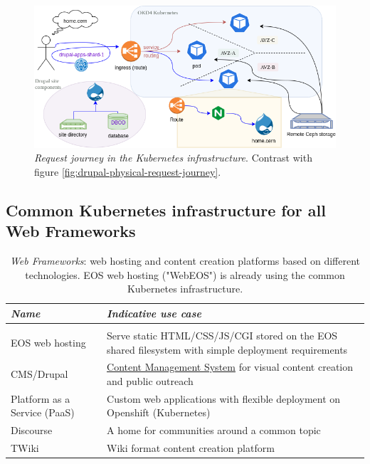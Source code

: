 \begin{figure}[t]
    \centering
    \includegraphics[width=\textwidth]{figures/drupal-k8s-request-journey}
    \caption{\emph{Request journey in the Kubernetes infrastructure}. Contrast with figure \ref{fig:drupal-physical-request-journey}.}
    \label{fig:drupal-k8s-request-journey}
\end{figure}

\subsection{Common Kubernetes infrastructure for all Web Frameworks}
\label{sec-web-frameworks}

\begin{table}[h!]
\begin{tabularx}{\textwidth}{ p{10em}| >{\raggedright\arraybackslash}X}
    \emph{Name} & \emph{Indicative use case} \\
    \hline \\
    EOS web hosting & Serve static HTML/CSS/JS/CGI stored on the EOS shared filesystem with simple deployment requirements \\
    CMS/Drupal & \hyperref[what-is-drupal]{Content Management System} for visual content creation and public outreach \\
    Platform as a Service (PaaS) & Custom web applications with flexible deployment on Openshift (Kubernetes) \\
    Discourse & A home for communities around a common topic \\
    TWiki & Wiki format content creation platform
\end{tabularx}
\caption{\emph{Web Frameworks}: web hosting and content creation platforms based on different technologies.
EOS web hosting ("WebEOS") is already using the common Kubernetes infrastructure.}
\label{tab-wf}
\end{table}

